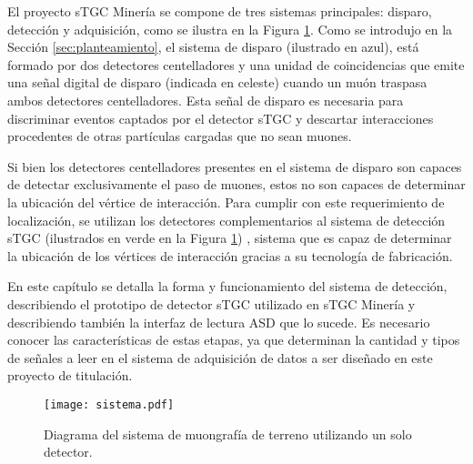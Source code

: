 	El proyecto sTGC Minería se compone de tres sistemas principales: disparo, detección y adquisición, como se ilustra en la Figura \ref{fig:sistema-completo}. Como se introdujo en la Sección \ref{sec:planteamiento}, el sistema de disparo \cite{Oyanadel2020SISTEMASTGC} (ilustrado en azul),  está formado por dos detectores centelladores y una unidad de coincidencias que emite una señal digital de disparo (indicada en celeste) cuando un muón traspasa ambos detectores centelladores. Esta señal de disparo es necesaria para discriminar eventos captados por el detector sTGC y descartar interacciones procedentes de otras partículas cargadas que no sean muones. 
	
Si bien los detectores centelladores presentes en el sistema de disparo son capaces de detectar exclusivamente el paso de muones, estos no son capaces de determinar la ubicación del vértice de interacción. Para cumplir con este requerimiento de localización, se utilizan los detectores complementarios al sistema de detección sTGC (ilustrados en verde en la Figura \ref{fig:sistema-completo}) , sistema que es capaz de determinar la ubicación de los vértices de interacción gracias a su tecnología de fabricación.
	
En este capítulo se detalla la forma y funcionamiento del sistema de detección, describiendo el prototipo de detector sTGC utilizado en sTGC Minería y describiendo también la interfaz de lectura ASD  que lo sucede. Es necesario conocer las características de estas etapas, ya que determinan la cantidad y tipos de señales a leer en el sistema de adquisición de datos a ser diseñado en este proyecto de titulación.
	


	\begin{figure}[h]
		\centering
		\texttt{[image: sistema.pdf]}
		\caption{Diagrama del sistema de muongrafía de terreno utilizando un solo detector.}
		\label{fig:sistema-completo}
	\end{figure}